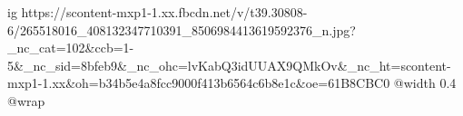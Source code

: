  
 
 
 
 

\ifcmt
  ig https://scontent-mxp1-1.xx.fbcdn.net/v/t39.30808-6/265518016_408132347710391_8506984413619592376_n.jpg?_nc_cat=102&ccb=1-5&_nc_sid=8bfeb9&_nc_ohc=lvKabQ3idUUAX9QMkOv&_nc_ht=scontent-mxp1-1.xx&oh=b34b5e4a8fcc9000f413b6564c6b8e1c&oe=61B8CBC0
  @width 0.4
  @wrap 
\fi
